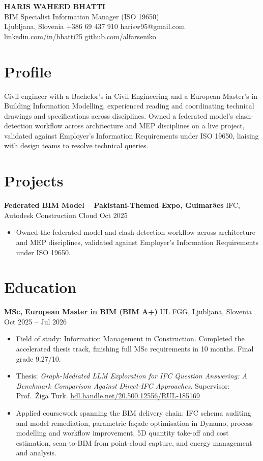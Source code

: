 \documentclass[a4paper,10.5pt]{article}
\newcommand{\datefill}{\dotfill}
\newcommand{\entry}[3]{\vspace{2.5pt}\noindent\textbf{#1} \textbar{} #2 \datefill{} #3\par\vspace{0.5pt}}
\newcommand{\ROLELINE}{BIM Specialist \textbar{} Information Manager (ISO 19650)}
\newcommand{\projGuimaraes}{%
\entry{Federated BIM Model -- Pakistani-Themed Expo, Guimar\~aes}{IFC, Autodesk Construction Cloud}{Oct 2025}
\begin{itemize}
  \item Owned the federated model and clash-detection workflow across architecture
        and MEP disciplines, validated against Employer's Information Requirements
        under ISO 19650.
\end{itemize}}
\begin{document}
\begin{center}
  {\LARGE\bfseries HARIS WAHEED BHATTI}\\[2pt]
  {\large \ROLELINE}\\[3pt]
  Ljubljana, Slovenia \textbar{} +386 69 437 910 \textbar{} harisw95@gmail.com\\
  \href{https://linkedin.com/in/bhatti25}{linkedin.com/in/bhatti25} \textbar{}
  \href{https://github.com/alfarseniko}{github.com/alfarseniko}
\end{center}
\vspace{-4pt}

\section{Profile}

\noindent Civil engineer with a Bachelor's in Civil Engineering and a European
Master's in Building Information Modelling, experienced reading and coordinating
technical drawings and specifications across disciplines. Owned a federated model's
clash-detection workflow across architecture and MEP disciplines on a live project,
validated against Employer's Information Requirements under ISO 19650, liaising with
design teams to resolve technical queries.

\section{Projects}

 \projGuimaraes

\section{Education}
\entry{MSc, European Master in BIM (BIM A+)}{UL FGG, Ljubljana, Slovenia}{Oct 2025 -- Jul 2026}
\begin{itemize}
  \item Field of study: Information Management in Construction. Completed the
        accelerated thesis track, finishing full MSc requirements in 10 months.
        Final grade 9.27/10.
  \item Thesis: \textit{Graph-Mediated LLM Exploration for IFC Question Answering:
        A Benchmark Comparison Against Direct-IFC Approaches}. Supervisor:
        Prof.~\v{Z}iga Turk. \href{http://hdl.handle.net/20.500.12556/RUL-185169}{hdl.handle.net/20.500.12556/RUL-185169}
  \item Applied coursework spanning the BIM delivery chain: IFC schema auditing and model remediation, parametric façade optimisation in Dynamo, process modelling and workflow improvement, 5D quantity take-off and cost estimation, scan-to-BIM from point-cloud capture, and energy management and analysis.
\end{itemize}
\end{document}
